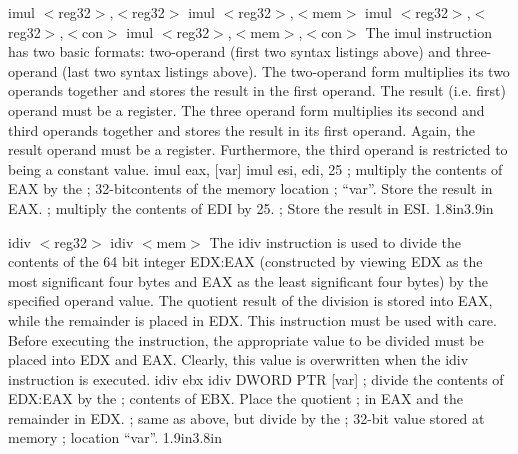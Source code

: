 {imul $<$reg32$>$,$<$reg32$>$\newline
imul $<$reg32$>$,$<$mem$>$\newline
imul $<$reg32$>$,$<$reg32$>$,$<$con$>$\newline
imul $<$reg32$>$,$<$mem$>$,$<$con$>$}
{The imul instruction has two basic formats: two-operand (first two
syntax listings above) and three-operand (last two syntax listings
above).  The two-operand form multiplies its two operands together and
stores the result in the first operand. The result (i.e. first)
operand must be a register.  The three operand form multiplies its
second and third operands together and stores the result in its first
operand. Again, the result operand must be a register.  Furthermore,
the third operand is restricted to being a constant value.}
{imul eax, [var]\newline\newline\newline
imul esi, edi, 25}
{; multiply the contents of EAX by the \newline
; 32-bitcontents of the memory location \newline
; ``var''. Store the result in EAX.\newline
; multiply the contents of EDI by 25. \newline
; Store the result in ESI.}
{1.8in}{3.9in}

{idiv $<$reg32$>$\newline
idiv $<$mem$>$}
{The idiv instruction is used to divide the contents of the 64 bit
  integer EDX:EAX (constructed by viewing EDX as the most significant
  four bytes and EAX as the least significant four bytes) by the
  specified operand value. The quotient result of the division is
  stored into EAX, while the remainder is placed in EDX. This
  instruction must be used with care. Before executing the
  instruction, the appropriate value to be divided must be placed into
  EDX and EAX. Clearly, this value is overwritten when the idiv
  instruction is executed.}
{idiv ebx \newline\newline\newline idiv DWORD PTR [var]}
{; divide the contents of EDX:EAX by the \newline
; contents of EBX. Place the quotient \newline
; in EAX and the remainder in EDX.\newline
; same as above, but divide by the \newline
; 32-bit value stored at memory \newline
; location ``var''.}
{1.9in}{3.8in}


